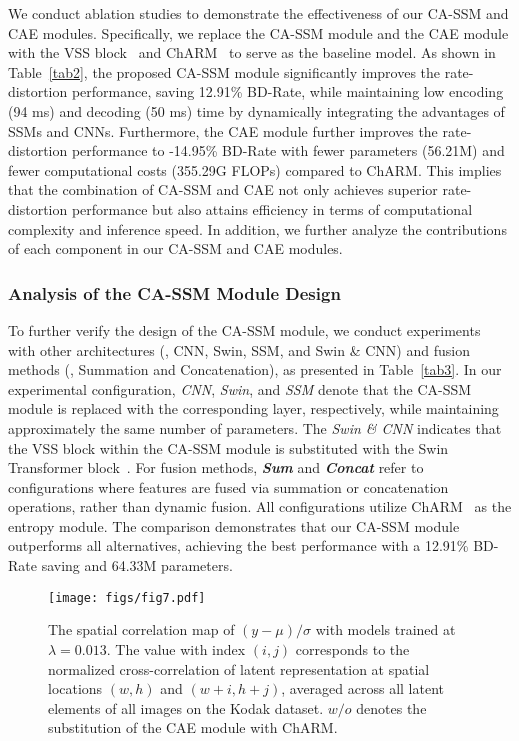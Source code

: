 We conduct ablation studies to demonstrate the effectiveness of our CA-SSM and CAE modules. 
Specifically, we replace the CA-SSM module and the CAE module with the VSS block~\cite{liu2024vmamba} and ChARM~\cite{minnen2020channel} to serve as the baseline model. 
As shown in Table~\ref{tab2}, the proposed CA-SSM module significantly improves the rate-distortion performance, saving 12.91\% BD-Rate, while maintaining low encoding (94 ms) and decoding (50 ms) time by dynamically integrating the advantages of SSMs and CNNs. 
Furthermore, the CAE module further improves the rate-distortion performance to -14.95\% BD-Rate with fewer parameters (56.21M) and fewer computational costs (355.29G FLOPs) compared to ChARM.
This implies that the combination of CA-SSM and CAE not only achieves superior rate-distortion performance but also attains efficiency in terms of computational complexity and inference speed.
In addition, we further analyze the contributions of each component in our CA-SSM and CAE modules.


\subsubsection{Analysis of the CA-SSM Module Design}

To further verify the design of the CA-SSM module, we conduct experiments with other architectures (\ie, CNN, Swin, SSM, and Swin \& CNN) and fusion methods (\ie, Summation and Concatenation), as presented in Table~\ref{tab3}.
In our experimental configuration, \textit{CNN}, \textit{Swin}, and \textit{SSM} denote that the CA-SSM module is replaced with the corresponding layer, respectively, while maintaining approximately the same number of parameters.
The \textit{Swin \& CNN} indicates that the VSS block within the CA-SSM module is substituted with the Swin Transformer block~\cite{liu2021swin}. 
For fusion methods, \textbf{\textit{Sum}} and \textbf{\textit{Concat}} refer to configurations where features are fused via summation or concatenation operations, rather than dynamic fusion.
All configurations utilize ChARM~\cite{minnen2020channel} as the entropy module.
The comparison demonstrates that our CA-SSM module outperforms all alternatives, achieving the best performance with a 12.91\% BD-Rate saving and 64.33M parameters.






\begin{figure}[t]
  \centering
   \texttt{[image: figs/fig7.pdf]}
   \vspace{-1em}
   \caption{
   The spatial correlation map of $(y-\mu)/\sigma$ with models trained at $\lambda=0.013$. 
   The value with index $(i, j)$ corresponds to the normalized cross-correlation of latent representation at spatial locations $(w, h)$ and $(w + i, h + j)$, averaged across all latent elements of all images on the Kodak dataset.
   $w/o$ denotes the substitution of the CAE module with ChARM.
   }
   \vspace{-1em}
   \label{fig7}
\end{figure}


